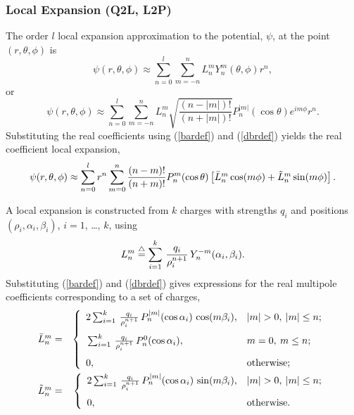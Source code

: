 \subsubsection{Local Expansion (Q2L, L2P)}

The order $l$ local expansion approximation to the potential, $\psi$,
at the point
$(r, \theta, \phi)$ 
is
\begin{equation}
\psi(r, \theta, \phi) \approx \sum_{n=0}^{l}\sum_{m=-n}^{n}L_n^mY_n^m(\theta, \phi)r^n,
\end{equation}
or
\begin{equation}
\psi(r, \theta, \phi) \approx\sum_{n=0}^{l}\sum_{m=-n}^{n}L_n^m\sqrt{\frac{(n-|m|)!}{(n+|m|)!}}P_n^{|m|}(\cos\theta)e^{im\phi}r^n.
\end{equation}
Substituting the real coefficients using (\ref{bardef}) and (\ref{dbrdef}) 
yields
the real coefficient local expansion,
\begin{equation}
\psi(r, \theta, \phi) \approx
\sum_{n=0}^{l}r^n\sum_{m=0}^n\frac{(n-m)!}{(n+m)!}
P_n^m(\cos\theta)\left[\mbox{$\bar{L}_{n}^{m}$}\cos(m\phi)+\mbox{$\tilde{L}_{n}^{m}$}\sin(m\phi)\right].
\label{relocl}
\end{equation}

A local expansion is constructed from
$k$ charges with strengths $q_i$ and positions
$(\rho_i, \alpha_i, \beta_i)$, $i=1$, \ldots, $k$, using
\begin{equation}
L_n^m \stackrel{\triangle}{=} \sum_{i=1}^{k}\, \frac{q_i}{\rho_i^{n+1}}\, Y_n^{-m}(\alpha_i, \beta_i).
\end{equation}
Substituting (\ref{bardef}) and (\ref{dbrdef}) gives expressions for
the real multipole coefficients corresponding to a set of charges,
\begin{eqnarray}
\Lb{n}{m} &=& \left\{
\begin{array}{ll}
\rule[-5mm]{0mm}{5mm}2\sum_{i=1}^{k}\, \frac{q_i}{\rho_i^{n+1}}\, P_n^{|m|}(\cos\alpha_i)\, \cos(m\beta_i), & |m|>0,\: |m|\leq n;\\
\rule[-5mm]{0mm}{5mm}\sum_{i=1}^{k}\, \frac{q_i}{\rho_i^{n+1}}\, P_n^{0}(\cos\alpha_i), & m=0,\: m\leq n;\\
0, &\mbox{otherwise;}
\end{array}
\right.\label{barloc}\\
\Lbb{n}{m} &=& \left\{
\begin{array}{ll}
\rule[-5mm]{0mm}{5mm}2\sum_{i=1}^{k}\, \frac{q_i}{\rho_i^{n+1}}\, P_n^{|m|}(\cos\alpha_i)\, \sin(m\beta_i), & |m|>0,\: |m|\leq n;\\
0, & \mbox{otherwise.}
\end{array}
\right.\label{dbrloc}
\end{eqnarray}

